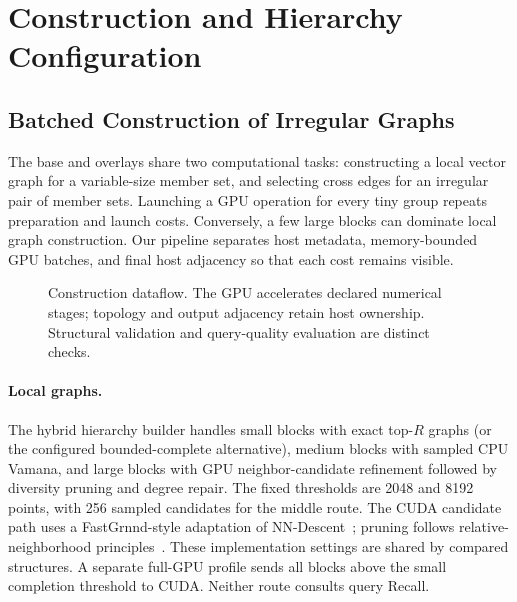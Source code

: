 \section{Construction and Hierarchy Configuration}
\label{sec:construction}
\subsection{Batched Construction of Irregular Graphs}
The base and overlays share two computational tasks: constructing a local
vector graph for a variable-size member set, and selecting cross edges for
an irregular pair of member sets.  Launching a GPU operation for every tiny
group repeats preparation and launch costs.  Conversely, a few large blocks
can dominate local graph construction.  Our pipeline separates host
metadata, memory-bounded GPU batches, and final host adjacency so that each
cost remains visible.

\begin{figure}[t]
\centering
{}
\caption{Construction dataflow. The GPU accelerates declared numerical
stages; topology and output adjacency retain host ownership. Structural
validation and query-quality evaluation are distinct checks.}
\label{fig:gpu-construction}
\end{figure}

\paragraph{Local graphs.}
The hybrid hierarchy builder handles small blocks with exact top-$R$ graphs (or the configured
bounded-complete alternative), medium blocks with sampled CPU Vamana, and large blocks
with GPU neighbor-candidate refinement followed by diversity pruning and
degree repair.  The fixed thresholds are 2048 and 8192 points, with 256
sampled candidates for the middle route.  The CUDA candidate path uses a
FastGrnnd-style adaptation of NN-Descent~\cite{dong2011nndescent}; pruning
follows relative-neighborhood principles~\cite{toussaint1980rng}.
These implementation settings are shared by compared structures.  A separate
full-GPU profile sends all blocks above the small completion threshold to
CUDA.  Neither route consults query Recall.

